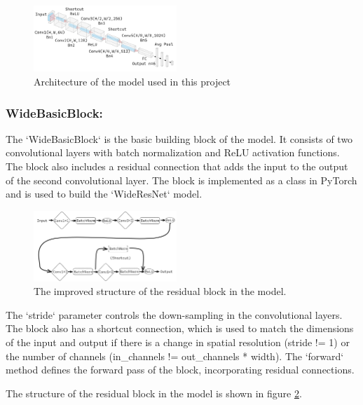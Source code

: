 \documentclass[twocolumn]{article}
\begin{document}
        \begin{figure}[ht]
            \centering
            \includegraphics[width=0.48\textwidth]{nn.png}
            \caption{Architecture of the model used in this project}
            \label{fig:nn}
        \end{figure}
    \subsubsection{WideBasicBlock:} 
    
    The `WideBasicBlock` is the basic building block of the model. It consists of two convolutional layers with batch normalization and ReLU activation functions. The block also includes a residual connection that adds the input to the output of the second convolutional layer. The block is implemented as a class in PyTorch and is used to build the `WideResNet` model.
    \begin{figure}[ht]
        \centering
        \includegraphics[width=0.48\textwidth]{custom_res_block.png}
        \caption{The improved structure of the residual block in the model.}
        \label{fig:custom_res_block}
    \end{figure}
    The `stride` parameter controls the down-sampling in the convolutional layers. The block also has a shortcut connection, which is used to match the dimensions of the input and output if there is a change in spatial resolution (stride != 1) or the number of channels (in\_channels != out\_channels * width). The `forward` method defines the forward pass of the block, incorporating residual connections.

    The structure of the residual block in the model is shown in figure \ref{fig:custom_res_block}.
\end{document}
